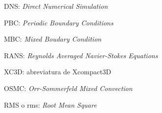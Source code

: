 \documentclass[12pt,screen,twoside]{ibtesis}
\begin{document}
\begin{preliminary}
\begin{abreviaturas}
\begin{itemize}
{{%
\item[] DNS: \textit{Direct Numerical Simulation}
\item[] PBC: \textit{Periodic Boundary Conditions} 
\item[] MBC: \textit{Mixed Boudary Condition}
\item[] RANS: \textit{Reynolds Averaged Navier-Stokes Equations}
\item[] XC3D: abreviatura de Xcompact3D
\item[] OSMC: \textit{Orr-Sommerfeld Mixed Convection}
\item[] RMS o rms: \textit{Root Mean Square}

}}
\end{itemize}
\end{abreviaturas}

\tableofcontents                %




\end{preliminary}









%
\appendix






\end{document}
